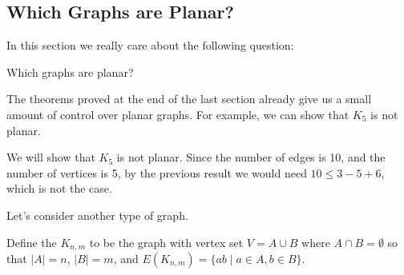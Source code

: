 \documentclass[a4paper]{scrartcl}
\begin{document}
\subsection{Which Graphs are Planar?}

In this section we really care about the following question:
\begin{center}
	Which graphs are planar?
\end{center}

The theorems proved at the end of the last section already give us a small amount of control over planar graphs. For example, we can show that $K_5$ is not planar.

\begin{example}
	We will show that $K_5$ is not planar.
	Since the number of edges is 10, and the number of vertices is 5, by the previous result we would need $10 \leq 3 - 5 + 6$, which is not the case.
\end{example}

Let's consider another type of graph.

\begin{definition}
	Define the  $K_{n, m}$ to be the graph with vertex set $V = A \cup B$ where $A \cap B = \emptyset$ so that $|A| = n$, $|B| = m$, and $E(K_{n, m}) = \{ab \mid a \in A, b \in B\}$.
	\end{definition}
\end{document}
